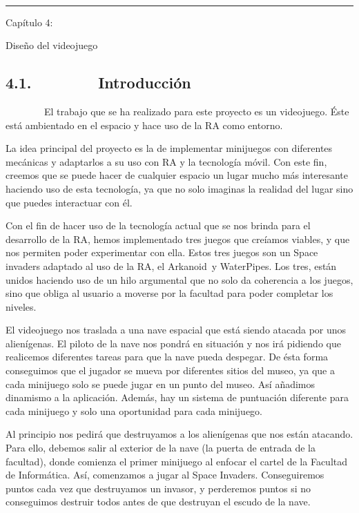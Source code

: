 \documentclass[]{article}
\begin{document}
~~~~~~~~

\begin{center}\rule{3in}{0.4pt}\end{center}

Capítulo 4:

Diseño del videojuego

\subsection{4.1.~~~~~~~~Introducción}

~~~~~~~~El trabajo que se ha realizado para este proyecto es un
videojuego. Éste está ambientado en el espacio y hace uso de la RA como
entorno.

La idea principal del proyecto es la de implementar minijuegos con
diferentes mecánicas y adaptarlos a su uso con RA y la tecnología móvil.
Con este fin, creemos que se puede hacer de cualquier espacio un lugar
mucho más interesante haciendo uso de esta tecnología, ya que no solo
imaginas la realidad del lugar sino que puedes interactuar con
él.~~~~~~~~

Con el fin de hacer uso de la tecnología actual que se nos brinda para
el desarrollo de la RA, hemos implementado tres juegos que creíamos
viables, y que nos permiten poder experimentar con ella. Estos tres
juegos son un Space invaders adaptado al uso de la RA, el Arkanoid~y
WaterPipes. Los tres, están unidos haciendo uso de un hilo argumental
que no solo da coherencia a los juegos, sino que obliga al usuario a
moverse por la facultad para poder completar los niveles.


El videojuego nos traslada a una nave espacial que está siendo atacada
por unos alienígenas. El piloto de la nave nos pondrá en situación y nos
irá pidiendo que realicemos diferentes tareas para que la nave pueda
despegar. De ésta forma conseguimos que el jugador se mueva por
diferentes sitios del museo, ya que a cada minijuego solo se puede jugar
en un punto del museo. Así añadimos dinamismo a la aplicación. Además,
hay un sistema de puntuación diferente para cada minijuego y solo una
oportunidad para cada minijuego.

Al principio nos pedirá que destruyamos a los alienígenas que nos están
atacando. Para ello, debemos salir al exterior de la nave (la puerta de
entrada de la facultad), donde comienza el primer minijuego al enfocar
el cartel de la Facultad de Informática. Así, comenzamos a jugar al
Space Invaders. Conseguiremos puntos cada vez que destruyamos un
invasor, y perderemos puntos si no conseguimos destruir todos antes de
que destruyan el escudo de la nave.
\end{document}
